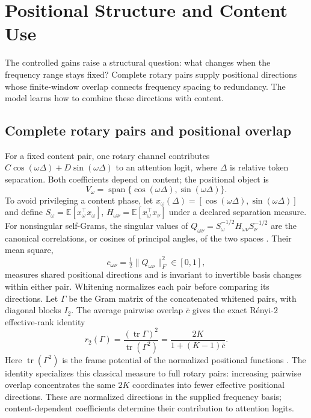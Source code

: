 \section{Positional Structure and Content Use}
\label{sec:theory}

The controlled gains raise a structural question: what changes when the
frequency range stays fixed? Complete rotary pairs supply positional directions
whose finite-window overlap connects frequency spacing to redundancy. The
model learns how to combine these directions with content.

\subsection{Complete rotary pairs and positional overlap}
\label{sec:subspaces}
\label{sec:budget}

For a fixed content pair, one rotary channel contributes $C\cos(\omega\Delta)+D\sin(\omega\Delta)$ to an attention logit, where $\Delta$ is relative token separation. Both coefficients depend on content; the positional object is
\begin{equation}
V_\omega=\operatorname{span}\{\cos(\omega\Delta),\sin(\omega\Delta)\}.
\label{eq:subspace}
\end{equation}
To avoid privileging a content phase, let $x_\omega(\Delta)=[\cos(\omega\Delta),\sin(\omega\Delta)]$ and define $S_\omega=\mathbb E[x_\omega^\top x_\omega]$, $H_{\omega\nu}=\mathbb E[x_\omega^\top x_\nu]$ under a declared separation measure. For nonsingular self-Grams, the singular values of $Q_{\omega\nu}=S_\omega^{-1/2}H_{\omega\nu}S_\nu^{-1/2}$ are the canonical correlations, or cosines of principal angles, of the two spaces \citep{bjorck1973angles}. Their mean square,
\begin{equation}
c_{\omega\nu}=\tfrac12\|Q_{\omega\nu}\|_F^2\in[0,1],
\label{eq:collision}
\end{equation}
measures shared positional directions and is invariant to invertible basis changes within either pair. Whitening normalizes each pair before comparing its directions. Let $\Gamma$ be the Gram matrix of the concatenated whitened pairs, with diagonal blocks $I_2$. The average pairwise overlap $\bar c$ gives the exact R\'enyi-$2$ effective-rank identity
\begin{equation}
r_2(\Gamma)=\frac{(\operatorname{tr}\Gamma)^2}{\operatorname{tr}(\Gamma^2)}
=\frac{2K}{1+(K-1)\bar c}.
\label{eq:budget-identity}
\end{equation}
Here $\operatorname{tr}(\Gamma^2)$ is the frame potential of the normalized positional functions \citep{benedetto2003frames}. The identity specializes this classical measure to full rotary pairs: increasing pairwise overlap concentrates the same $2K$ coordinates into fewer effective positional directions. These are normalized directions in the supplied frequency basis; content-dependent coefficients determine their contribution to attention logits.

